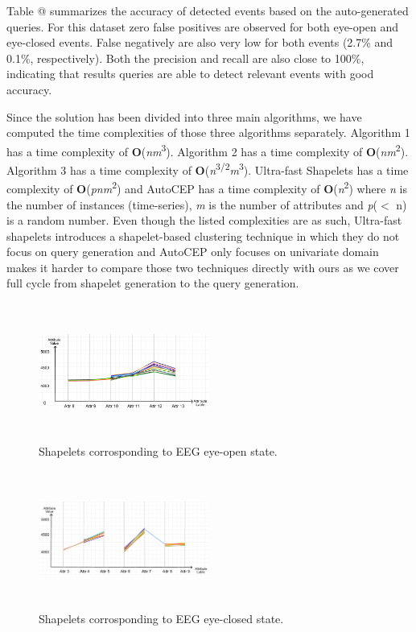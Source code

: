 \documentclass[conference]{IEEEtran}  %
\makeatletter
\newcommand*{\rom}[1]{\expandafter\@slowromancap\romannumeral #1@}
\makeatother
\begin{document}
Table \rom{2} summarizes the accuracy of detected events based on the auto-generated queries. For this dataset zero false positives are observed for both eye-open and eye-closed events. False negatively are also very low for both events (2.7\% and 0.1\%, respectively). Both the precision and recall are also close to 100\%, indicating that results queries are able to detect relevant events with good accuracy.

Since the solution has been divided into three main algorithms, we have computed the time complexities of those three algorithms separately. Algorithm 1 has a  time complexity of \textbf{O}(\textit{nm}\textsuperscript{3}). Algorithm 2 has a time complexity of \textbf{O}(\textit{nm}\textsuperscript{2}). Algorithm 3 has a time complexity of \textbf{O}(\textit{n}\textsuperscript{3/2}\textit{m}\textsuperscript{3}). Ultra-fast Shapelets \cite{IEEEexample:UltraFast} has a time complexity of \textbf{O}(\textit{pnm}\textsuperscript{2}) and AutoCEP \cite{IEEEexample:autoCEP} has a time complexity of \textbf{O}(\textit{n}\textsuperscript{2}) where \textit{n} is the number of instances (time-series), \textit{m} is the number of attributes and \textit{p}($<$ n) is a random number. Even though the listed complexities are as such, Ultra-fast shapelets introduces a shapelet-based clustering technique in which they do not focus on query generation and AutoCEP only focuses on univariate domain makes it harder to compare those two techniques directly with ours as we cover full cycle from shapelet generation to the query generation.



\begin{figure}[h!]
\includegraphics[width=0.5\textwidth,height=4.5cm]{EEG_event1.png}
\caption{Shapelets corrosponding to EEG eye-open state.}
\label{fig:EEGEvent1}
\end{figure}

\begin{figure}[h!]
\includegraphics[width=0.5\textwidth,height=4.5cm]{EEG_event2.png}
\caption{Shapelets corrosponding to EEG eye-closed state.}
\label{fig:EEGevent2}
\end{figure}
\end{document}
